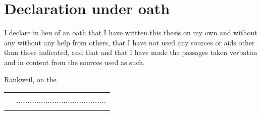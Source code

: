 \section*{Declaration under oath}
I declare in lieu of an oath that I have written this thesis on my own and without any
without any help from others, that I have not used any sources or aids other than those indicated, and that
and that I have made the passages taken verbatim and in content from the sources used
as such.

\vspace{0.3cm}
\par Rankweil, on the \PrintDate
\linebreak
\linebreak

\begin{tabular}{p{7cm}C{5cm}}
	& ........................................ \\
	& \studentN  \\ [2.5em]
\end{tabular}

